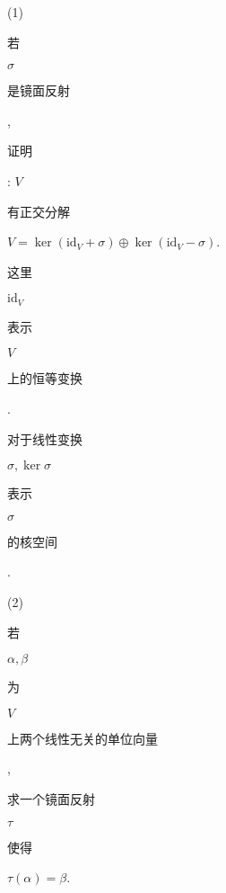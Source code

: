 \documentclass[10pt]{article}
\begin{document}
(1) \begin{CJK}{UTF8}{mj}若\end{CJK} $\sigma$ \begin{CJK}{UTF8}{mj}是镜面反射\end{CJK}, \begin{CJK}{UTF8}{mj}证明\end{CJK}: $V$ \begin{CJK}{UTF8}{mj}有正交分解\end{CJK} $V=\operatorname{ker}\left(\mathrm{id}_{V}+\sigma\right) \oplus \operatorname{ker}\left(\mathrm{id}_{V}-\sigma\right)$. \begin{CJK}{UTF8}{mj}这里\end{CJK} $\mathrm{id}_{V}$ \begin{CJK}{UTF8}{mj}表示\end{CJK} $V$ \begin{CJK}{UTF8}{mj}上的恒等变换\end{CJK}. \begin{CJK}{UTF8}{mj}对于线性变换\end{CJK} $\sigma, \operatorname{ker} \sigma$ \begin{CJK}{UTF8}{mj}表示\end{CJK} $\sigma$ \begin{CJK}{UTF8}{mj}的核空间\end{CJK}.

(2) \begin{CJK}{UTF8}{mj}若\end{CJK} $\alpha, \beta$ \begin{CJK}{UTF8}{mj}为\end{CJK} $V$ \begin{CJK}{UTF8}{mj}上两个线性无关的单位向量\end{CJK}, \begin{CJK}{UTF8}{mj}求一个镜面反射\end{CJK} $\tau$ \begin{CJK}{UTF8}{mj}使得\end{CJK} $\tau(\alpha)=\beta$.
\end{document}

